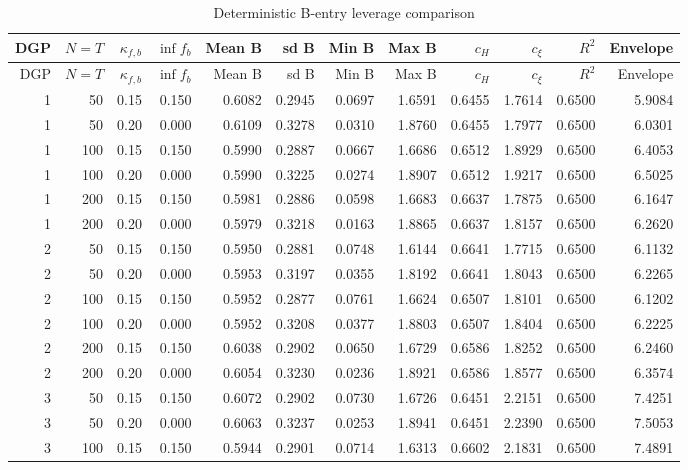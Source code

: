 \begingroup
\small
\begin{longtable}{rrrrrrrrrrrr}
\caption{Deterministic B-entry leverage comparison}\label{tab:mc-b-entry-leverage}\\
\toprule
DGP & $N=T$ & $\kappa_{f,b}$ & $\inf f_b$ & Mean B & sd B & Min B & Max B & $c_H$ & $c_\xi$ & $R^2$ & Envelope \\
\midrule
\endfirsthead
\toprule
DGP & $N=T$ & $\kappa_{f,b}$ & $\inf f_b$ & Mean B & sd B & Min B & Max B & $c_H$ & $c_\xi$ & $R^2$ & Envelope \\
\midrule
\endhead
1 & 50 & 0.15 & 0.150 & 0.6082 & 0.2945 & 0.0697 & 1.6591 & 0.6455 & 1.7614 & 0.6500 & 5.9084 \\
1 & 50 & 0.20 & 0.000 & 0.6109 & 0.3278 & 0.0310 & 1.8760 & 0.6455 & 1.7977 & 0.6500 & 6.0301 \\
1 & 100 & 0.15 & 0.150 & 0.5990 & 0.2887 & 0.0667 & 1.6686 & 0.6512 & 1.8929 & 0.6500 & 6.4053 \\
1 & 100 & 0.20 & 0.000 & 0.5990 & 0.3225 & 0.0274 & 1.8907 & 0.6512 & 1.9217 & 0.6500 & 6.5025 \\
1 & 200 & 0.15 & 0.150 & 0.5981 & 0.2886 & 0.0598 & 1.6683 & 0.6637 & 1.7875 & 0.6500 & 6.1647 \\
1 & 200 & 0.20 & 0.000 & 0.5979 & 0.3218 & 0.0163 & 1.8865 & 0.6637 & 1.8157 & 0.6500 & 6.2620 \\
2 & 50 & 0.15 & 0.150 & 0.5950 & 0.2881 & 0.0748 & 1.6144 & 0.6641 & 1.7715 & 0.6500 & 6.1132 \\
2 & 50 & 0.20 & 0.000 & 0.5953 & 0.3197 & 0.0355 & 1.8192 & 0.6641 & 1.8043 & 0.6500 & 6.2265 \\
2 & 100 & 0.15 & 0.150 & 0.5952 & 0.2877 & 0.0761 & 1.6624 & 0.6507 & 1.8101 & 0.6500 & 6.1202 \\
2 & 100 & 0.20 & 0.000 & 0.5952 & 0.3208 & 0.0377 & 1.8803 & 0.6507 & 1.8404 & 0.6500 & 6.2225 \\
2 & 200 & 0.15 & 0.150 & 0.6038 & 0.2902 & 0.0650 & 1.6729 & 0.6586 & 1.8252 & 0.6500 & 6.2460 \\
2 & 200 & 0.20 & 0.000 & 0.6054 & 0.3230 & 0.0236 & 1.8921 & 0.6586 & 1.8577 & 0.6500 & 6.3574 \\
3 & 50 & 0.15 & 0.150 & 0.6072 & 0.2902 & 0.0730 & 1.6726 & 0.6451 & 2.2151 & 0.6500 & 7.4251 \\
3 & 50 & 0.20 & 0.000 & 0.6063 & 0.3237 & 0.0253 & 1.8941 & 0.6451 & 2.2390 & 0.6500 & 7.5053 \\
3 & 100 & 0.15 & 0.150 & 0.5944 & 0.2901 & 0.0714 & 1.6313 & 0.6602 & 2.1831 & 0.6500 & 7.4891 \\

\end{longtable}
